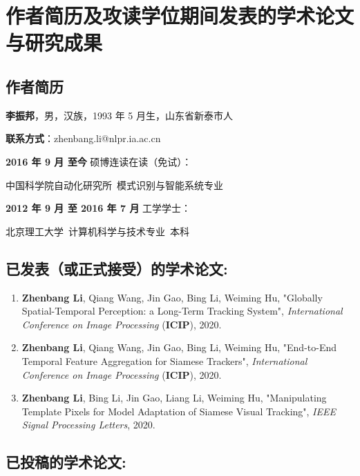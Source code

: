 \chapter{作者简历及攻读学位期间发表的学术论文与研究成果}

\section*{作者简历}

\textbf{李振邦}，男，汉族，1993 年 5 月生，山东省新泰市人

\textbf{联系方式}：zhenbang.li@nlpr.ia.ac.cn

\textbf{2016 年 9 月 至今} 硕博连读在读（免试）：

	中国科学院自动化研究所~模式识别与智能系统专业

\textbf{2012 年 9 月 至 2016 年 7 月} 工学学士：

	北京理工大学~计算机科学与技术专业~本科


\section*{已发表（或正式接受）的学术论文:}

{
\setlist[enumerate]{}%
\begin{enumerate}[nosep]
    \item \textbf{Zhenbang Li}, Qiang Wang, Jin Gao,  Bing Li, Weiming Hu, "Globally Spatial-Temporal Perception: a Long-Term Tracking System", \textit{International Conference on Image Processing} (\textbf{ICIP}), 2020.
    \item \textbf{Zhenbang Li}, Qiang Wang, Jin Gao,  Bing Li, Weiming Hu, "End-to-End Temporal Feature Aggregation for Siamese Trackers", \textit{International Conference on Image Processing} (\textbf{ICIP}), 2020.
    \item \textbf{Zhenbang Li}, Bing Li, Jin Gao, Liang Li, Weiming Hu, "Manipulating Template Pixels for Model Adaptation of Siamese Visual Tracking", \textit{IEEE Signal Processing Letters}, 2020.
\end{enumerate}
}

\section*{已投稿的学术论文:}

